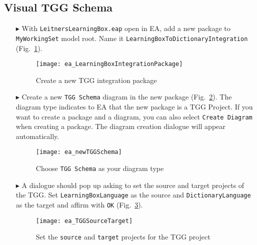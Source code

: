 \newpage
\hypertarget{schema vis}{}
\subsection{Visual TGG Schema}
\visHeader

\begin{itemize}

\item[$\blacktriangleright$] With \texttt{LeitnersLearningBox.eap} open in EA, add a new package to \texttt{MyWorkingSet} model root. Name it
\texttt{Learning\-Box\-To\-Dictionary\-Integration} (Fig.~\ref{ea:intgPackage}).

\vspace{0.5cm}

\begin{figure}[htbp]
\begin{center}
  \texttt{[image: ea\_LearningBoxIntegrationPackage]}
  \caption{Create a new TGG integration package}  
  \label{ea:intgPackage}
\end{center}
\end{figure}

\item[$\blacktriangleright$] Create a new  \texttt{TGG Schema} diagram in the new package (Fig.~\ref{ea:tgg_diagram_type}). The diagram type indicates to EA
that the new package is a TGG Project. If you want to create a package and a diagram, you can also select \texttt{Create Diagram} when creating a package. The diagram creation dialogue will appear automatically.

\vspace{0.5cm}

\begin{figure}[htbp]
\begin{center}
  \texttt{[image: ea\_newTGGSchema]}
  \caption{Choose \texttt{TGG Schema} as your diagram type}  
  \label{ea:tgg_diagram_type}
\end{center}
\end{figure}

\item[$\blacktriangleright$] A dialogue should pop up asking to set the source and target projects of the TGG. Set \texttt{Learning\-Box\-Language} as the
source and \texttt{Dictionary\-Language} as the target and affirm with \texttt{OK} (Fig.~\ref{ea:select_source_target}).

\vspace{0.5cm}

\begin{figure}[htbp]
\begin{center}
  \texttt{[image: ea\_TGGSourceTarget]}
  \caption{Set the \texttt{source} and \texttt{target} projects for the TGG project}  
  \label{ea:select_source_target}
\end{center}
\end{figure}


\end{itemize}
